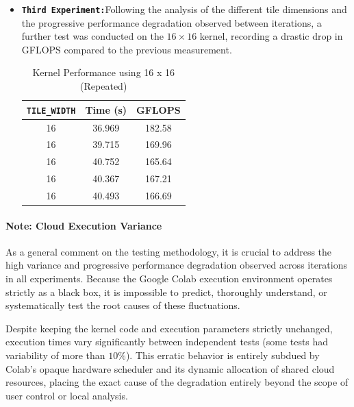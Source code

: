 \begin{itemize}
    This is attributable to the lower data reuse. In the Tiling technique, each element loaded from the slower Global Memory to the faster Shared Memory is reused for calculations a number of times equal to the dimension of the tile itself (\texttt{TILE\_WIDTH}). 
    
    With a $32 \times 32$ tile, each fetch in Global Memory is reused 32 times, while with a $16 \times 16$ tile, the same fetch is reused only 16 times. As previously stated for the $32 \times 32$ kernel, a performance degradation can be observed between iterations.


    \item \textbf{\texttt{Third Experiment:}}Following the analysis of the different tile dimensions and the progressive performance degradation observed between iterations, a further test was conducted on the $16 \times 16$ kernel, recording a drastic drop in GFLOPS compared to the previous measurement. 

    \begin{table}[H]
    \centering
    \begin{tabular}{ccc}
    \toprule
    \texttt{TILE\_WIDTH} & Time (s) & GFLOPS \\
    \midrule
    16 & 36.969 & 182.58 \\
    16 & 39.715 & 169.96 \\
    16 & 40.752 & 165.64 \\
    16 & 40.367 & 167.21 \\
    16 & 40.493 & 166.69 \\
    \bottomrule
    \end{tabular}
    \caption{Kernel Performance using 16 x 16 (Repeated)}
    \label{tab:kernel_16x16_final}
    \end{table}
    
\end{itemize}

\paragraph{Note: Cloud Execution Variance} 
As a general comment on the testing methodology, it is crucial to address the high variance and progressive performance degradation observed across iterations in all experiments. Because the Google Colab execution environment operates strictly as a black box, it is impossible to predict, thoroughly understand, or systematically test the root causes of these fluctuations.

Despite keeping the kernel code and execution parameters strictly unchanged, execution times vary significantly between independent tests (some tests had variability of more than $10\%$). This erratic behavior is entirely subdued by Colab's opaque hardware scheduler and its dynamic allocation of shared cloud resources, placing the exact cause of the degradation entirely beyond the scope of user control or local analysis.

